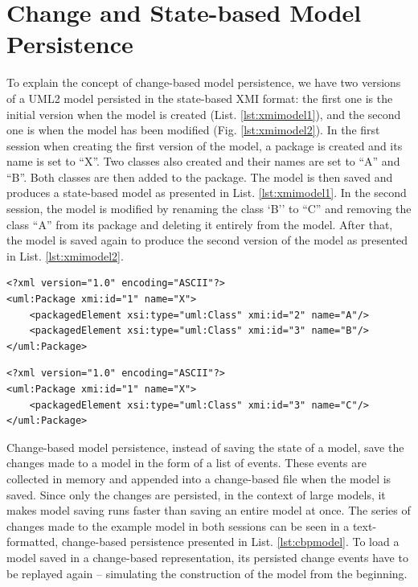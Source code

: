 \documentclass[10pt,conference]{IEEEtran}
\begin{document}
\section{Change and State-based Model Persistence}
\label{sec:change_and_state_based_model_persistence}
To explain the concept of change-based model persistence, we have two versions of a UML2 \cite{eclipse2017uml2} model persisted in the state-based XMI format: the first one is the initial version when the model is created (List. \ref{lst:xmimodel1}), and the second one is when the model has been modified (Fig. \ref{lst:xmimodel2}). In the first session when creating the first version of the model, a package is created and its name is set to ``X''. Two classes also created and their names are set to ``A'' and ``B''. Both classes are then added to the package. The model is then saved and produces a state-based model as presented in List. \ref{lst:xmimodel1}. In the second session, the model is modified by renaming the class `B'' to ``C'' and removing the class ``A'' from its package and deleting it entirely from the model. After that, the model is saved again to produce the second version of the model as presented in List. \ref{lst:xmimodel2}.

\begin{lstlisting}[style=xmi,caption={The first version of the UML2 example model in XMI format when initially created.},label=lst:xmimodel1]
<?xml version="1.0" encoding="ASCII"?>
<uml:Package xmi:id="1" name="X">
    <packagedElement xsi:type="uml:Class" xmi:id="2" name="A"/>
    <packagedElement xsi:type="uml:Class" xmi:id="3" name="B"/>
</uml:Package>
\end{lstlisting}

\begin{lstlisting}[style=xmi,caption={The second version of the UML2 example model in XMI format after the second session.},label=lst:xmimodel2]
<?xml version="1.0" encoding="ASCII"?>
<uml:Package xmi:id="1" name="X">
    <packagedElement xsi:type="uml:Class" xmi:id="3" name="C"/>
</uml:Package>
\end{lstlisting}

Change-based model persistence, instead of saving the state of a model, save the changes made to a model in the form of a list of events. These events are collected in memory and appended into a change-based file when the model is saved. Since only the changes are persisted, in the context of large models, it makes model saving runs faster than saving an entire model at once. The series of changes made to the example model in both sessions can be seen in a text-formatted, change-based persistence presented in List. \ref{lst:cbpmodel}. To load a model saved in a change-based representation, its persisted change events have to be replayed again -- simulating the construction of the model from the beginning.
\end{document}
